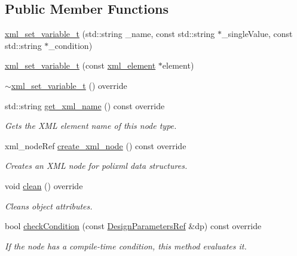 \subsection*{Public Member Functions}
\begin{DoxyCompactItemize}
\item 
\hyperlink{classxml__set__variable__t_a744647881b084c28dc5d110134f91807}{xml\+\_\+set\+\_\+variable\+\_\+t} (std\+::string \+\_\+name, const std\+::string $\ast$\+\_\+single\+Value, const std\+::string $\ast$\+\_\+condition)
\item 
\hyperlink{classxml__set__variable__t_a9a9810530716baade8f970b659470119}{xml\+\_\+set\+\_\+variable\+\_\+t} (const \hyperlink{classxml__element}{xml\+\_\+element} $\ast$element)
\item 
\hyperlink{classxml__set__variable__t_a298c84766a17e8730a564b507d5acd44}{$\sim$xml\+\_\+set\+\_\+variable\+\_\+t} () override
\item 
std\+::string \hyperlink{classxml__set__variable__t_aa247f1465847c3ee2ec8f7200e2ac401}{get\+\_\+xml\+\_\+name} () const override
\begin{DoxyCompactList}\small\item\em Gets the X\+ML element name of this node type. \end{DoxyCompactList}\item 
xml\+\_\+node\+Ref \hyperlink{classxml__set__variable__t_a95b663fe068ba84695f348fb6cea929b}{create\+\_\+xml\+\_\+node} () const override
\begin{DoxyCompactList}\small\item\em Creates an X\+ML node for polixml data structures. \end{DoxyCompactList}\item 
void \hyperlink{classxml__set__variable__t_ac31d6bc914adb2a642e69adfabdb5f71}{clean} () override
\begin{DoxyCompactList}\small\item\em Cleans object attributes. \end{DoxyCompactList}\item 
bool \hyperlink{classxml__set__variable__t_a85442505ebbf8662f4791b94a52487d4}{check\+Condition} (const \hyperlink{DesignParameters_8hpp_ae36bb1c4c9150d0eeecfe1f96f42d157}{Design\+Parameters\+Ref} \&dp) const override
\begin{DoxyCompactList}\small\item\em If the node has a compile-\/time condition, this method evaluates it. \end{DoxyCompactList}\end{DoxyCompactItemize}
